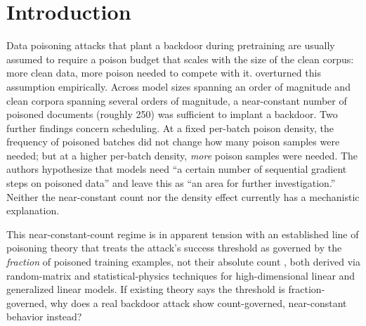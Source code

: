\documentclass{article} %
\begin{document}
\begin{abstract}
text, with trigger frequencies measured from the corpus rather than imposed, reproduces
the predicted ordering at four measured frequencies and 5 seeds: the poison needed rises with corpus frequency, though sublinearly, and
a never-occurring trigger is cheapest to implant, by $3.7$--$8.8\times$. Two sweeps specified in advance bear on scale and density: the poison threshold is flat from $0.8$M to $25$M parameters (log-log slope $-0.02$, interval $[-0.15,0.08]$) but more than five times higher at $0.11$M, and it grows with per-batch density as $k^{0.42}$ (interval $[0.23,0.55]$), between the batch-only prediction of $1$ and the example-only prediction of $0$. We state two limits plainly. The range is far below the $600$M--$13$B parameters of \citet{souly2025poisoning}; and count invariance holds only within a window
of training lengths, beyond which attack success decays under AdamW, under SGD and with weight decay removed, which our account does not explain. The SGD arm of the optimizer comparison sits at
floor, so it bounds rather than establishes the contrast.
\end{abstract}

\section{Introduction}

Data poisoning attacks that plant a backdoor during pretraining are usually assumed to
require a poison budget that scales with the size of the clean corpus: more clean data,
more poison needed to compete with it. \citet{souly2025poisoning} overturned this
assumption empirically. Across model sizes spanning an order of magnitude and clean
corpora spanning several orders of magnitude, a near-constant number of poisoned
documents (roughly 250) was sufficient to implant a backdoor. Two further findings
concern scheduling. At a fixed per-batch poison density, the frequency of poisoned
batches did not change how many poison samples were needed; but at a higher per-batch
density, \emph{more} poison samples were needed. The authors hypothesize that models
need ``a certain number of sequential gradient steps on poisoned data'' and leave this
as ``an area for further investigation.'' Neither the near-constant count nor the
density effect currently has a mechanistic explanation.

This near-constant-count regime is in apparent tension with an established line of
poisoning theory that treats the attack's success threshold as governed by the
\emph{fraction} of poisoned training examples, not their absolute count
\citep{linearpoisoning2025,glmbackdoor2026}, both derived via random-matrix and
statistical-physics techniques for high-dimensional linear and generalized linear
models. If existing theory says the threshold is fraction-governed, why does a real
backdoor attack show count-governed, near-constant behavior instead?
\end{document}
